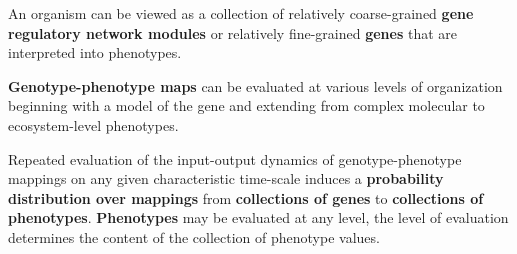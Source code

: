 \begin{frame}
\begin{block}{}
An organism can be viewed as a collection of relatively coarse-grained \textbf{gene regulatory network modules} or relatively fine-grained \textbf{genes} that are interpreted into phenotypes.
\end{block}
\begin{block}{}
\textbf{Genotype-phenotype maps} can be evaluated at various levels of organization  beginning with a model of the gene and extending from complex molecular to ecosystem-level phenotypes.
\end{block}
\begin{block}{}
Repeated evaluation of the input-output dynamics of genotype-phenotype mappings on any given characteristic time-scale induces a \textbf{probability distribution over mappings} from \textbf{collections of genes} to \textbf{collections of phenotypes}. \textbf{Phenotypes} may be evaluated at any level, the level of evaluation determines the content of the collection of phenotype values.
\end{block}
\end{frame}